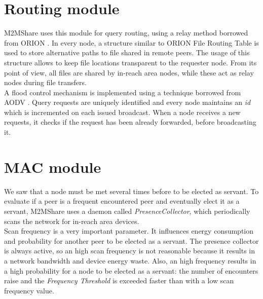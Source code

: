 

\section{Routing module}
M2MShare uses this module for query routing, using a relay method borrowed from ORION \cite{orion}. In every node, a structure similar to ORION File Routing Table is used to store alternative paths to file shared in remote peers. The usage of this structure allows to keep file locations transparent to the requester node. From its point of view, all files are shared by in-reach area nodes, while these act as relay nodes during file transfers.\\
A flood control mechanism is implemented using a technique borrowed from AODV \cite{aodv}. Query requests are uniquely identified and every node maintains an \textit{id} which is incremented on each issued broadcast. When a node receives a new requests, it checks if the request has been already forwarded, before broadcasting it.



\section{MAC module}
\label{descrPresenceCollector}
We saw that a node must be met several times before to be elected as servant. To evaluate if a peer is a frequent encountered peer and eventually elect it as a servant, M2MShare uses a daemon called \textit{PresenceCollector}, which periodically scans the network for in-reach area devices. 
\\

Scan frequency is a very important parameter. It influences energy consumption and probability for another peer to be elected as a servant. The presence collector is always active, so an high scan frequency is not reasonable because it results in a network bandwidth and device energy waste. Also, an high frequency results in a high probability for a node to be elected as a servant: the number of encounters raise and the \textit{Frequency Threshold} is exceeded faster than with a low scan frequency value.
\\

